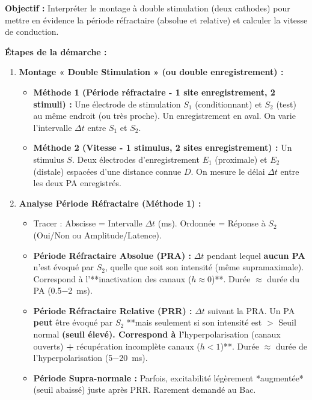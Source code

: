 \documentclass[11pt]{article}
\begin{document}
\begin{methode}
\textbf{Objectif :} Interpréter le montage à double stimulation (deux cathodes) pour mettre en évidence la période réfractaire (absolue et relative) et calculer la vitesse de conduction.

\textbf{Étapes de la démarche :}
\begin{enumerate}
    \item \textbf{Montage « Double Stimulation » (ou double enregistrement) :}
    \begin{itemize}
        \item \textbf{Méthode 1 (Période réfractaire - 1 site enregistrement, 2 stimuli) :} Une électrode de stimulation $S_1$ (conditionnant) et $S_2$ (test) au même endroit (ou très proche). Un enregistrement en aval. On varie l'intervalle $\Delta t$ entre $S_1$ et $S_2$.
        \item \textbf{Méthode 2 (Vitesse - 1 stimulus, 2 sites enregistrement) :} Un stimulus $S$. Deux électrodes d'enregistrement $E_1$ (proximale) et $E_2$ (distale) espacées d'une distance connue $D$. On mesure le délai $\Delta t$ entre les deux PA enregistrés.
    \end{itemize}
    \item \textbf{Analyse Période Réfractaire (Méthode 1) :}
    \begin{itemize}
        \item Tracer : Abscisse = Intervalle $\Delta t$ (ms). Ordonnée = Réponse à $S_2$ (Oui/Non ou Amplitude/Latence).
        \item \textbf{Période Réfractaire Absolue (PRA) :} $\Delta t$ pendant lequel \textbf{aucun PA} n'est évoqué par $S_2$, quelle que soit son intensité (même supramaximale). Correspond à l'**inactivation des canaux  ($h \approx 0$)**. Durée $\approx$ durée du PA (\SI{0.5-2}{ms}).
        \item \textbf{Période Réfractaire Relative (PRR) :} $\Delta t$ suivant la PRA. Un PA \textbf{peut} être évoqué par $S_2$ **mais seulement si son intensité est $>$ Seuil normal\textbf{ (seuil élevé). Correspond à l'}hyperpolarisation (canaux  ouverts)\textbf{ + }récupération incomplète canaux  ($h < 1$)**. Durée $\approx$ durée de l'hyperpolarisation (\SI{5-20}{ms}).
        \item \textbf{Période Supra-normale :} Parfois, excitabilité légèrement *augmentée* (seuil abaissé) juste après PRR. Rarement demandé au Bac.
    \end{itemize}

\end{enumerate}
\end{methode}
\end{document}
